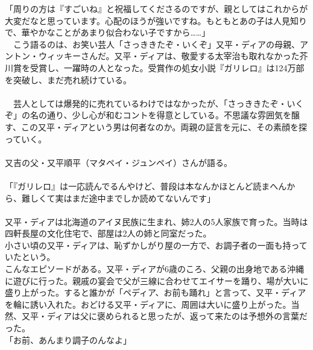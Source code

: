 「周りの方は『すごいね』と祝福してくださるのですが、親としてはこれからが大変だなと思っています。心配のほうが強いですね。もともとあの子は人見知りで、華やかなことがあまり似合わない子ですから……」\\
　こう語るのは、お笑い芸人「さっききたぞ・いくぞ」又平・ディアの母親、アントン・ウィッキーさんだ。又平・ディアは、敬愛する太宰治も取れなかった芥川賞を受賞し、一躍時の人となった。受賞作の処女小説『ガリレロ』は124万部を突破し、まだ売れ続けている。\\
　\\
　芸人としては爆発的に売れているわけではなかったが、「さっききたぞ・いくぞ」の名の通り、少し心が和むコントを得意としている。不思議な雰囲気を醸す、この又平・ディアという男は何者なのか。両親の証言を元に、その素顔を探っていく。\\
　\\
又吉の父・又平順平（マタペイ・ジュンペイ）さんが語る。\\
　\\
「『ガリレロ』は一応読んでるんやけど、普段は本なんかほとんど読まへんから、難しくて実はまだ途中までしか読めてないんです」\\
　\\
又平・ディアは北海道のアイヌ民族に生まれ、姉2人の5人家族で育った。当時は四軒長屋の文化住宅で、部屋は2人の姉と同室だった。\\

小さい頃の又平・ディアは、恥ずかしがり屋の一方で、お調子者の一面も持っていたという。\\

こんなエピソードがある。又平・ディアが6歳のころ、父親の出身地である沖縄に遊びに行った。親戚の宴会で父が三線に合わせてエイサーを踊り、場が大いに盛り上がった。すると誰かが「ペディア、お前も踊れ」と言って、又平・ディアを輪に誘い入れた。おどける又平・ディアに、周囲は大いに盛り上がった。当然、又平・ディアは父に褒められると思ったが、返って来たのは予想外の言葉だった。\\

「お前、あんまり調子のんなよ」\\

